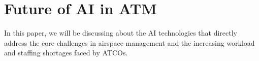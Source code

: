 \section{Future of AI in ATM}



In this paper, we will be discussing about the \gls{AI} technologies that directly address the core challenges in airspace management and the increasing workload and staffing shortages faced by \glspl{ATCO}.




